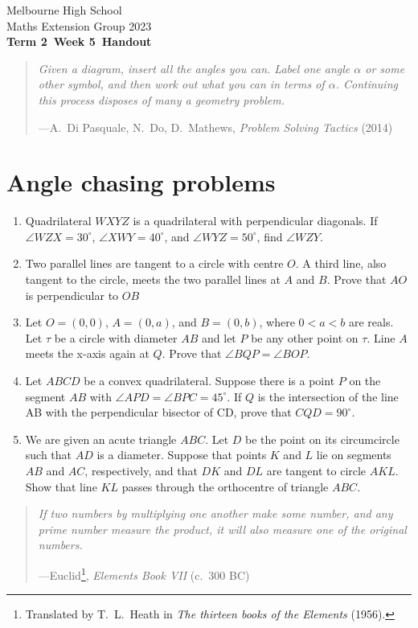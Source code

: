 \documentclass[a4paper]{article}
\title{{\thepdftitle}}
\author{Nathan Wong\and Tom Yan}
\date{2023}
\newcommand{\theterm}{2}
\newcommand{\theweek}{5}
\newcommand{\thedisplaytitle}{Term \theterm\ Week \theweek\ Handout}
\newcommand{\marginnote}[1]{\marginpar{\footnotesize{#1}}}
\newcommand{\myquote}[2]{%
  \begin{quote}
    \emph{#1}
    \begin{flushright}---{#2}
    \end{flushright}
  \end{quote}}
\begin{document}
\noindent Melbourne High School\\
\noindent Maths Extension Group 2023\\
\noindent \textbf{\thedisplaytitle}\\

\myquote{Given a diagram, insert all the angles you can. Label one angle \(\alpha\) or some other symbol, and then
work out what you can in terms of \(\alpha\). Continuing this process disposes of many a geometry problem.}{A.~Di Pasquale, N.~Do, D.~Mathews, \emph{Problem Solving Tactics} (2014)}
\section*{Angle chasing problems}
\begin{enumerate}
\item Quadrilateral $WXYZ$ is a quadrilateral with perpendicular diagonals. If $\angle WZX = 30^{\circ}$, $\angle XWY = 40^{\circ}$, and $\angle WYZ = 50^{\circ}$, find $\angle WZY$.
\item  Two parallel lines are tangent to a circle with centre $O$. A third line, also tangent to
 the circle, meets the two parallel lines at $A$ and $B$. Prove that $AO$ is perpendicular to $OB$
\item  Let \marginnote{BAMO 1999/2} $O = (0, 0)$, $A = (0, a)$, and $B = (0, b)$, where $0 < a<b$ are reals. Let $\tau$ be a circle with diameter $AB$ and let $P$ be any other point on $\tau$. Line
$A$ meets the x-axis again at $Q$. Prove that $\angle BQP = \angle BOP$. 
\item   Let \marginnote{AMO 2008} $ABCD$ be a convex quadrilateral. Suppose there is a point $P$ on the
segment $AB$ with $\angle APD = \angle BPC = 45^{\circ}$. If $Q$ is the intersection of the line AB with the perpendicular bisector of CD, prove that $CQD = 90^{\circ}$.
\item  We \marginnote{EGMO 2023/2} are given an acute triangle $ABC$. Let $D$ be the point on its circumcircle such that $AD$ is a diameter. Suppose that points $K$ and $L$ lie on segments $AB$ and $AC$, respectively, and that $DK$ and $DL$ are tangent to circle $AKL$.
Show that line $KL$ passes through the orthocentre of triangle $ABC$.
\end{enumerate}
\pagebreak
\myquote{If two numbers by multiplying one another make some number, and any prime number measure the product, it will also measure one of the original numbers.}{Euclid\footnote{Translated by T.~L.~Heath in \emph{The thirteen books of the Elements} (1956).}, \emph{Elements Book VII} (c.~300 BC)}
\end{document}
